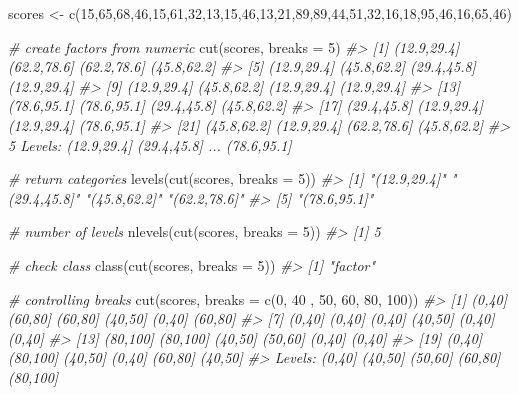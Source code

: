 \documentclass[
]{book}
\newenvironment{Shaded}{\begin{snugshade}}{\end{snugshade}}
\newcommand{\AttributeTok}[1]{\textcolor[rgb]{0.77,0.63,0.00}{#1}}
\newcommand{\CommentTok}[1]{\textcolor[rgb]{0.56,0.35,0.01}{\textit{#1}}}
\newcommand{\DecValTok}[1]{\textcolor[rgb]{0.00,0.00,0.81}{#1}}
\newcommand{\FunctionTok}[1]{\textcolor[rgb]{0.00,0.00,0.00}{#1}}
\newcommand{\NormalTok}[1]{#1}
\newcommand{\OtherTok}[1]{\textcolor[rgb]{0.56,0.35,0.01}{#1}}
\begin{document}
\begin{Shaded}
\begin{Highlighting}[]
\NormalTok{scores }\OtherTok{\textless{}{-}} \FunctionTok{c}\NormalTok{(}\DecValTok{15}\NormalTok{,}\DecValTok{65}\NormalTok{,}\DecValTok{68}\NormalTok{,}\DecValTok{46}\NormalTok{,}\DecValTok{15}\NormalTok{,}\DecValTok{61}\NormalTok{,}\DecValTok{32}\NormalTok{,}\DecValTok{13}\NormalTok{,}\DecValTok{15}\NormalTok{,}\DecValTok{46}\NormalTok{,}\DecValTok{13}\NormalTok{,}\DecValTok{21}\NormalTok{,}\DecValTok{89}\NormalTok{,}\DecValTok{89}\NormalTok{,}\DecValTok{44}\NormalTok{,}\DecValTok{51}\NormalTok{,}\DecValTok{32}\NormalTok{,}\DecValTok{16}\NormalTok{,}\DecValTok{18}\NormalTok{,}\DecValTok{95}\NormalTok{,}\DecValTok{46}\NormalTok{,}\DecValTok{16}\NormalTok{,}\DecValTok{65}\NormalTok{,}\DecValTok{46}\NormalTok{)}

\CommentTok{\# create factors from numeric}
\FunctionTok{cut}\NormalTok{(scores, }\AttributeTok{breaks =} \DecValTok{5}\NormalTok{)}
\CommentTok{\#\textgreater{}  [1] (12.9,29.4] (62.2,78.6] (62.2,78.6] (45.8,62.2]}
\CommentTok{\#\textgreater{}  [5] (12.9,29.4] (45.8,62.2] (29.4,45.8] (12.9,29.4]}
\CommentTok{\#\textgreater{}  [9] (12.9,29.4] (45.8,62.2] (12.9,29.4] (12.9,29.4]}
\CommentTok{\#\textgreater{} [13] (78.6,95.1] (78.6,95.1] (29.4,45.8] (45.8,62.2]}
\CommentTok{\#\textgreater{} [17] (29.4,45.8] (12.9,29.4] (12.9,29.4] (78.6,95.1]}
\CommentTok{\#\textgreater{} [21] (45.8,62.2] (12.9,29.4] (62.2,78.6] (45.8,62.2]}
\CommentTok{\#\textgreater{} 5 Levels: (12.9,29.4] (29.4,45.8] ... (78.6,95.1]}

\CommentTok{\# return categories}
\FunctionTok{levels}\NormalTok{(}\FunctionTok{cut}\NormalTok{(scores, }\AttributeTok{breaks =} \DecValTok{5}\NormalTok{))}
\CommentTok{\#\textgreater{} [1] "(12.9,29.4]" "(29.4,45.8]" "(45.8,62.2]" "(62.2,78.6]"}
\CommentTok{\#\textgreater{} [5] "(78.6,95.1]"}

\CommentTok{\# number of levels}
\FunctionTok{nlevels}\NormalTok{(}\FunctionTok{cut}\NormalTok{(scores, }\AttributeTok{breaks =} \DecValTok{5}\NormalTok{))}
\CommentTok{\#\textgreater{} [1] 5}

\CommentTok{\# check class}
\FunctionTok{class}\NormalTok{(}\FunctionTok{cut}\NormalTok{(scores, }\AttributeTok{breaks =} \DecValTok{5}\NormalTok{))}
\CommentTok{\#\textgreater{} [1] "factor"}

\CommentTok{\# controlling breaks}
\FunctionTok{cut}\NormalTok{(scores, }\AttributeTok{breaks =} \FunctionTok{c}\NormalTok{(}\DecValTok{0}\NormalTok{, }\DecValTok{40}\NormalTok{ , }\DecValTok{50}\NormalTok{, }\DecValTok{60}\NormalTok{, }\DecValTok{80}\NormalTok{, }\DecValTok{100}\NormalTok{))}
\CommentTok{\#\textgreater{}  [1] (0,40]   (60,80]  (60,80]  (40,50]  (0,40]   (60,80] }
\CommentTok{\#\textgreater{}  [7] (0,40]   (0,40]   (0,40]   (40,50]  (0,40]   (0,40]  }
\CommentTok{\#\textgreater{} [13] (80,100] (80,100] (40,50]  (50,60]  (0,40]   (0,40]  }
\CommentTok{\#\textgreater{} [19] (0,40]   (80,100] (40,50]  (0,40]   (60,80]  (40,50] }
\CommentTok{\#\textgreater{} Levels: (0,40] (40,50] (50,60] (60,80] (80,100]}


\end{Highlighting}
\end{Shaded}
\end{document}
